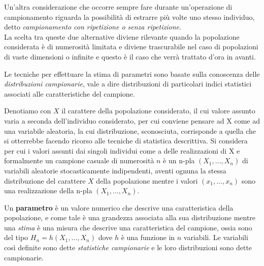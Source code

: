 \documentclass[a4paper,12pt, oneside]{book}
\begin{document}
Un'altra considerazione che occorre sempre fare durante un'operazione di
campionamento riguarda la possibilità di estrarre più volte uno stesso individuo,
detto \textit{campionamento con ripetizione o senza ripetizione}.\\
La scelta tra queste due alternative diviene rilevante quando la popolazione
considerata è di numerosità limitata e diviene trascurabile nel caso di popolazioni di
vaste dimensioni o infinite e questo è il caso che verrà trattato d'ora in avanti.

Le tecniche per effettuare la stima di parametri sono basate sulla conoscenza delle \emph{distribuzioni campionarie}, 
vale a dire distribuzioni di particolari indici statistici associati alle caratteristiche del campione.

Denotiamo con $X$ il carattere della popolazione considerato, il cui valore assunto varia a seconda 
dell'individuo considerato, per cui conviene pensare ad X come ad una variabile aleatoria, la cui distribuzione,
sconosciuta, corrisponde a quella che si otterrebbe facendo ricorso alle tecniche di statistica descrittiva.\newline
Si considera per cui i valori assunti dai singoli individui come a delle realizzazioni di X e formalmente un campione
casuale di numerosità $n$ è un n-pla $(X_1, \dots, X_n)$ di variabili aleatorie stocasticamente indipendenti,
aventi ognuna la stessa distribuzione del carattere $X$ della popolazione mentre i valori $(x_1, \dots, x_n)$
sono una realizzazione della n-pla $(X_1, \dots, X_n)$.

Un \textbf{parametro} è un valore numerico che descrive una caratteristica della popolazione, 
e come tale è una grandezza associata alla sua distribuzione mentre una \emph{stima} è una misura che descrive
una caratteristica del campione, ossia sono del tipo $H_n = h(X_1, \dots, X_n)$ dove $h$ è una funzione in $n$ variabili.\newline
Le variabili così definite sono dette \emph{statistiche campionarie} e le loro distribuzioni sono dette campionarie.
\end{document}
